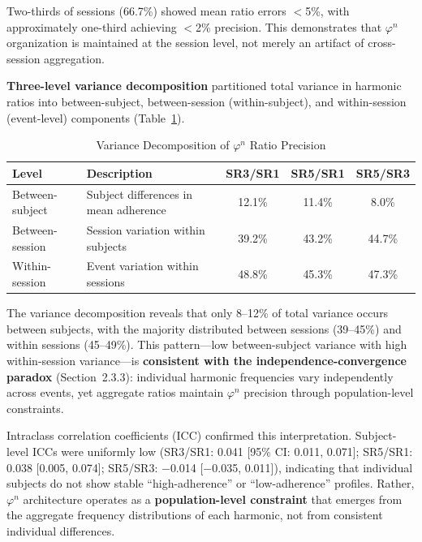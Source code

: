 \documentclass[11pt,a4paper]{article}
\newcommand{\phisym}{\varphi}
\begin{document}
Two-thirds of sessions (66.7\%) showed mean ratio errors $<$5\%, with approximately one-third achieving $<$2\% precision. This demonstrates that $\phisym^n$ organization is maintained at the session level, not merely an artifact of cross-session aggregation.

\textbf{Three-level variance decomposition} partitioned total variance in harmonic ratios into between-subject, between-session (within-subject), and within-session (event-level) components (Table~\ref{tab:variance_decomposition}).

\begin{table}[H]
\centering
\caption{Variance Decomposition of $\phisym^n$ Ratio Precision}
\label{tab:variance_decomposition}
\begin{tabular}{@{}llccc@{}}
\toprule
Level & Description & SR3/SR1 & SR5/SR1 & SR5/SR3 \\
\midrule
Between-subject & Subject differences in mean adherence & 12.1\% & 11.4\% & 8.0\% \\
Between-session & Session variation within subjects & 39.2\% & 43.2\% & 44.7\% \\
Within-session & Event variation within sessions & 48.8\% & 45.3\% & 47.3\% \\
\bottomrule
\end{tabular}
\end{table}

The variance decomposition reveals that only 8--12\% of total variance occurs between subjects, with the majority distributed between sessions (39--45\%) and within sessions (45--49\%). This pattern---low between-subject variance with high within-session variance---is \textbf{consistent with the independence-convergence paradox} (Section~2.3.3): individual harmonic frequencies vary independently across events, yet aggregate ratios maintain $\phisym^n$ precision through population-level constraints.

Intraclass correlation coefficients (ICC) confirmed this interpretation. Subject-level ICCs were uniformly low (SR3/SR1: 0.041 [95\% CI: 0.011, 0.071]; SR5/SR1: 0.038 [0.005, 0.074]; SR5/SR3: $-$0.014 [$-$0.035, 0.011]), indicating that individual subjects do not show stable ``high-adherence'' or ``low-adherence'' profiles. Rather, $\phisym^n$ architecture operates as a \textbf{population-level constraint} that emerges from the aggregate frequency distributions of each harmonic, not from consistent individual differences.
\end{document}
